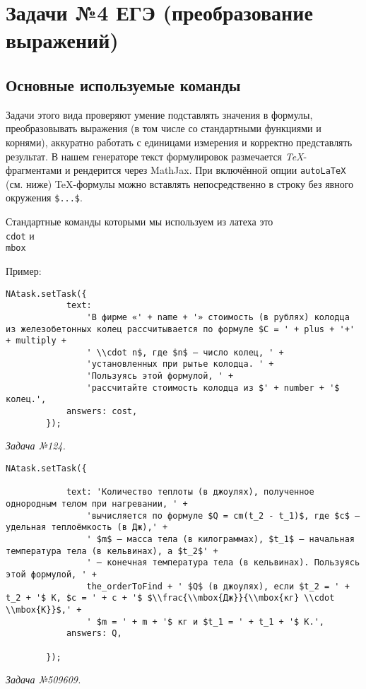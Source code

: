 \section{Задачи №4 ЕГЭ (преобразование выражений)}

\subsection{Основные используемые команды}

Задачи этого вида проверяют умение подставлять значения в формулы, преобразовывать выражения (в том числе со стандартными функциями и корнями), аккуратно работать с единицами измерения и корректно представлять результат. 
В нашем генераторе текст формулировок размечается \emph{TeX}-фрагментами и рендерится через MathJax. 
При включённой опции \verb|autoLaTeX| (см. ниже) TeX-формулы можно вставлять непосредственно в строку без явного окружения \verb|$...$|.

Стандартные команды которыми мы используем из латеха это \texttt{\\cdot} и \texttt{\\mbox}

Пример:
\begin{lstlisting}
NAtask.setTask({
			text:
				'В фирме «' + name + '» стоимость (в рублях) колодца из железобетонных колец рассчитывается по формуле $C = ' + plus + '+' + multiply + 
				' \\cdot n$, где $n$ – число колец, ' +
				'установленных при рытье колодца. ' +
				'Пользуясь этой формулой, ' +
				'рассчитайте стоимость колодца из $' + number + '$ колец.',
			answers: cost,
		});
\end{lstlisting}
\textsl{Задача №124.}

 

\begin{lstlisting}
NAtask.setTask({

			text: 'Количество теплоты (в джоулях), полученное однородным телом при нагревании, ' +
				'вычисляется по формуле $Q = cm(t_2 - t_1)$, где $c$ – удельная теплоёмкость (в Дж),' +
				' $m$ – масса тела (в килограммах), $t_1$ – начальная температура тела (в кельвинах), а $t_2$' +
				' – конечная температура тела (в кельвинах). Пользуясь этой формулой, ' +
				the_orderToFind + ' $Q$ (в джоулях), если $t_2 = ' + t_2 + '$ К, $c = ' + c + '$ $\\frac{\\mbox{Дж}}{\\mbox{кг} \\cdot \\mbox{К}}$,' +
				' $m = ' + m + '$ кг и $t_1 = ' + t_1 + '$ К.',
			answers: Q,

		});
\end{lstlisting}
\textsl{Задача №509609.}

